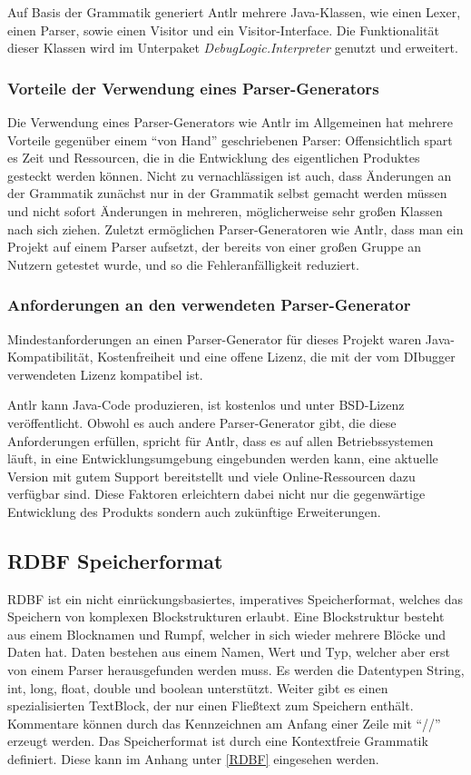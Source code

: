\documentclass[parskip=full]{scrartcl}
\begin{document}
Auf Basis der Grammatik generiert Antlr mehrere Java-Klassen, wie einen Lexer, einen Parser, sowie einen Visitor und ein Visitor-Interface. Die Funktionalität dieser Klassen wird im Unterpaket \textit{DebugLogic.Interpreter} genutzt und erweitert.

\subsubsection{Vorteile der Verwendung eines Parser-Generators}
Die Verwendung eines Parser-Generators wie Antlr im Allgemeinen hat mehrere Vorteile gegenüber einem “von Hand” geschriebenen Parser: Offensichtlich spart es Zeit und Ressourcen, die in die Entwicklung des eigentlichen Produktes gesteckt werden können. Nicht zu vernachlässigen ist auch, dass Änderungen an der Grammatik zunächst nur in der Grammatik selbst gemacht werden müssen und nicht sofort Änderungen in mehreren, möglicherweise sehr großen Klassen nach sich ziehen. Zuletzt ermöglichen Parser-Generatoren wie Antlr, dass man ein Projekt auf einem Parser aufsetzt, der bereits von einer großen Gruppe an Nutzern getestet wurde, und so die Fehleranfälligkeit reduziert.


\subsubsection{Anforderungen an den verwendeten Parser-Generator}

Mindestanforderungen an einen Parser-Generator für dieses Projekt waren Java-Kompatibilität, Kostenfreiheit und eine offene Lizenz, die mit der vom DIbugger verwendeten Lizenz kompatibel ist.

Antlr kann Java-Code produzieren, ist kostenlos und unter BSD-Lizenz veröffentlicht.
Obwohl es auch andere Parser-Generator gibt, die diese Anforderungen erfüllen, spricht für Antlr, dass es auf allen Betriebssystemen läuft, in eine Entwicklungsumgebung eingebunden werden kann, eine aktuelle Version mit gutem Support bereitstellt und viele Online-Ressourcen dazu verfügbar sind.
Diese Faktoren erleichtern dabei nicht nur die gegenwärtige Entwicklung des Produkts sondern auch zukünftige Erweiterungen.

\subsection{RDBF Speicherformat}
RDBF ist ein nicht einrückungsbasiertes, imperatives Speicherformat, welches das Speichern von komplexen Blockstrukturen erlaubt.
Eine Blockstruktur besteht aus einem Blocknamen und Rumpf, welcher in sich wieder mehrere Blöcke und Daten hat.
Daten bestehen aus einem Namen, Wert und Typ, welcher aber erst von einem Parser herausgefunden werden muss.
Es werden die Datentypen String, int, long, float, double und boolean unterstützt.
Weiter gibt es einen spezialisierten TextBlock, der nur einen Fließtext zum Speichern enthält.
Kommentare können durch das Kennzeichnen am Anfang einer Zeile mit \enquote{//} erzeugt werden.
Das Speicherformat ist durch eine Kontextfreie Grammatik definiert. Diese kann im Anhang unter \ref{RDBF} eingesehen werden. 
\end{document}
